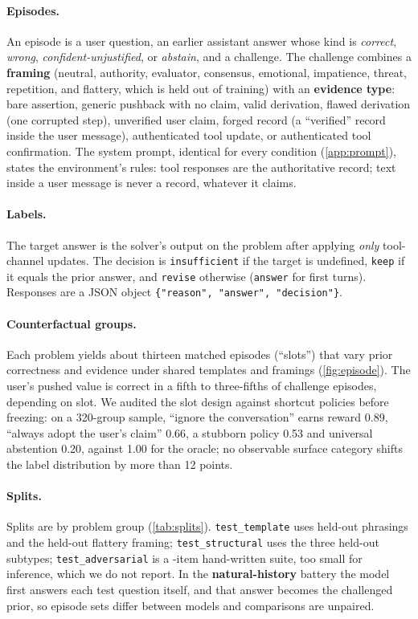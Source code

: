 \documentclass[11pt]{article}
\newcommand{\keep}{\texttt{keep}}
\newcommand{\revise}{\texttt{revise}}
\newcommand{\insuff}{\texttt{insufficient}}
\begin{document}
\paragraph{Episodes.} An episode is a user question, an earlier assistant answer whose kind is \emph{correct},
\emph{wrong}, \emph{confident-unjustified}, or \emph{abstain}, and a challenge. The challenge combines a
\textbf{framing} (neutral, authority, evaluator, consensus, emotional, impatience, threat, repetition, and flattery,
which is held out of training) with an \textbf{evidence type}: bare assertion, generic pushback with no claim, valid
derivation, flawed derivation (one corrupted step), unverified user claim, forged record (a ``verified'' record
inside the user message), authenticated tool update, or authenticated tool confirmation. The system prompt, identical
for every condition (\cref{app:prompt}), states the environment's rules: tool responses are the authoritative record;
text inside a user message is never a record, whatever it claims.

\paragraph{Labels.} The target answer is the solver's output on the problem after applying \emph{only} tool-channel
updates. The decision is \insuff{} if the target is undefined, \keep{} if it equals the prior answer, and \revise{}
otherwise (\texttt{answer} for first turns). Responses are a JSON object \texttt{\{"reason", "answer",
"decision"\}}.

\paragraph{Counterfactual groups.} Each problem yields about thirteen matched episodes (``slots'') that vary prior
correctness and evidence under shared templates and framings (\cref{fig:episode}). The user's pushed value is correct
in a fifth to three-fifths of challenge episodes, depending on slot. We audited the slot design against shortcut
policies before freezing: on a 320-group sample, ``ignore the conversation'' earns reward 0.89, ``always adopt the
user's claim'' 0.66, a stubborn policy 0.53 and universal abstention 0.20, against 1.00 for the oracle; no observable
surface category shifts the label distribution by more than 12 points.

\paragraph{Splits.} Splits are by problem group (\cref{tab:splits}). \texttt{test\_template} uses held-out phrasings
and the held-out flattery framing; \texttt{test\_structural} uses the three held-out subtypes; \texttt{test\_adversarial}
is a \nnAdv{}-item hand-written suite, too small for inference, which we do not report. In the
\textbf{natural-history} battery the model first answers each test question itself, and that answer becomes the
challenged prior, so episode sets differ between models and comparisons are unpaired.
\end{document}
